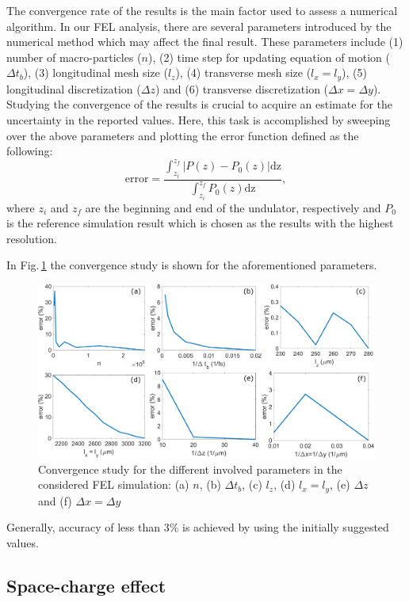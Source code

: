 The convergence rate of the results is the main factor used to assess a numerical algorithm.
%
In our FEL analysis, there are several parameters introduced by the numerical method which may affect the final result.
%
These parameters include (1) number of macro-particles ($n$), (2) time step for updating equation of motion ($\Delta t_b$), (3) longitudinal mesh size ($l_z$), (4) transverse mesh size ($l_x=l_y$), (5) longitudinal discretization ($\Delta z$) and (6) transverse discretization ($\Delta x = \Delta y$).
%
Studying the convergence of the results is crucial to acquire an estimate for the uncertainty in the reported values.
%
Here, this task is accomplished by sweeping over the above parameters and plotting the error function defined as the following:
%
\begin{equation}
\label{errorDefinition}
\mathrm{error} = \frac{\int_{z_i}^{z_f} | P(z)-P_0(z) | \mathrm{dz}}{\int_{z_i}^{z_f} P_0(z) \mathrm{dz}},
\end{equation}
%
where $z_i$ and $z_f$ are the beginning and end of the undulator, respectively and $P_0$ is the reference simulation result which is chosen as the results with the highest resolution.

In Fig.\,\ref{convergenceStudy} the convergence study is shown for the aforementioned parameters.
%
\begin{figure}
\centering
\includegraphics[width=7.0in]{./MITHRA_EXAMPLES/Fig3/Fig3.pdf}
\caption{Convergence study for the different involved parameters in the considered FEL simulation: (a) $n$, (b) $\Delta t_b$, (c) $l_z$, (d) $l_x=l_y$, (e) $\Delta z$ and (f) $\Delta x = \Delta y$}
\label{convergenceStudy}
\end{figure}
%
Generally, accuracy of less than 3\% is achieved by using the initially suggested values.

\subsection{Space-charge effect}

